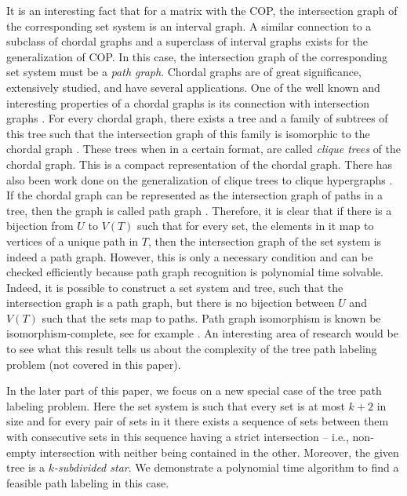\documentclass[MS]             %
              {iitmdiss_as}    %
\begin{document}
{}It
is an interesting fact that for a matrix with the COP, the
intersection graph of the corresponding set system is an interval
graph.  A similar connection to a subclass of chordal graphs and a
superclass of interval graphs exists for the generalization of COP.
In this case, the intersection graph of the corresponding set system
must be a {\em path graph}. Chordal graphs are of great significance,
extensively studied, and have several applications.  One of the well
known and interesting properties of a chordal graphs is its connection
with intersection graphs \cite{mcg04}. For every chordal graph, there
exists a tree and a family of subtrees of this tree such that the
intersection graph of this family is isomorphic to the chordal graph
\cite{plr70,gav78,bp93}.  These trees when in a certain format, are
called {\em clique trees} \cite{apy92} of the chordal graph. This is a
compact representation of the chordal graph. There has also been work
done on the generalization of clique trees to clique hypergraphs
\cite{km02}.  If the chordal graph can be represented as the
intersection graph of paths in a tree, then the graph is called path
graph \cite{mcg04}.  Therefore, it is clear that if there is a
bijection from $U$ to $V(T)$ such that for every set, the elements in
it map to vertices of a unique path in $T$, then the intersection
graph of the set system is indeed a path graph.  However, this is only
a necessary condition and can be checked efficiently because path
graph recognition is polynomial time
solvable\cite{gav78,aas93}. Indeed, it is possible to construct a set
system and tree, such that the intersection graph is a path graph, but
there is no bijection between $U$ and $V(T)$ such that the sets map to
paths. Path graph isomorphism is known be isomorphism-complete, see
for example \cite{kklv10}. An interesting area of research would be to
see what this result tells us about the complexity of the tree path
labeling problem (not covered in this paper).

In the later part of this paper, we focus on a new special case of the
tree path labeling problem. Here the set system is such that every set
is at most $k+2$ in size and for every pair of sets in it there exists
a sequence of sets between them with consecutive sets in this sequence
having a strict intersection -- i.e., non-empty intersection with
neither being contained in the other. Moreover, the given tree is a
{\em $k$-subdivided star}. We demonstrate a polynomial time algorithm
to find a feasible path labeling in this case.
\end{document}
